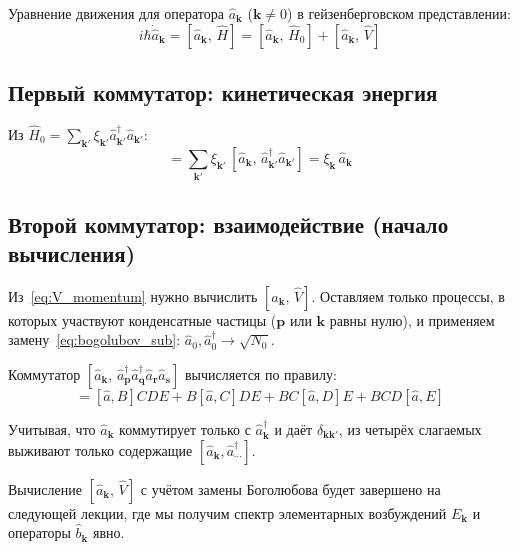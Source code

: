 \documentclass[../general/general]{subfiles}
\begin{document}
Уравнение движения для оператора $\hat{a}_\mathbf{k}$ ($\mathbf{k}\neq 0$) в гейзенберговском представлении:
\begin{equation}
    i\hbar\dot{\hat{a}}_\mathbf{k} = [\hat{a}_\mathbf{k},\,\hat{H}] = [\hat{a}_\mathbf{k},\,\hat{H}_0] + [\hat{a}_\mathbf{k},\,\hat{V}]
    \label{eq:eom_a}
\end{equation}

\subsection{Первый коммутатор: кинетическая энергия}

Из $\hat{H}_0 = \sum_{\mathbf{k}'}\xi_{\mathbf{k}'}\hat{a}^\dagger_{\mathbf{k}'}\hat{a}_{\mathbf{k}'}$:
\begin{equation}
    [\hat{a}_\mathbf{k},\,\hat{H}_0] = \sum_{\mathbf{k}'}\xi_{\mathbf{k}'}\,[\hat{a}_\mathbf{k},\,\hat{a}^\dagger_{\mathbf{k}'}\hat{a}_{\mathbf{k}'}] = \xi_\mathbf{k}\,\hat{a}_\mathbf{k}
\end{equation}

\subsection{Второй коммутатор: взаимодействие (начало вычисления)}

Из~\eqref{eq:V_momentum} нужно вычислить $[\hat{a}_\mathbf{k},\,\hat{V}]$. Оставляем только процессы, в которых участвуют конденсатные частицы ($\mathbf{p}$ или $\mathbf{k}$ равны нулю), и применяем замену~\eqref{eq:bogolubov_sub}: $\hat{a}_0, \hat{a}^\dagger_0 \to \sqrt{N_0}$.

Коммутатор $[\hat{a}_\mathbf{k},\,\hat{a}^\dagger_\mathbf{p}\hat{a}^\dagger_\mathbf{q}\hat{a}_\mathbf{r}\hat{a}_\mathbf{s}]$ вычисляется по правилу:
\begin{equation}
    [\hat{a},\,BCDE] = [\hat{a},B]CDE + B[\hat{a},C]DE + BC[\hat{a},D]E + BCD[\hat{a},E]
\end{equation}

Учитывая, что $\hat{a}_\mathbf{k}$ коммутирует только с $\hat{a}^\dagger_\mathbf{k}$ и даёт $\delta_{\mathbf{k}\mathbf{k}'}$, из четырёх слагаемых выживают только содержащие $[\hat{a}_\mathbf{k}, \hat{a}^\dagger_{\cdots}]$.

Вычисление $[\hat{a}_\mathbf{k},\,\hat{V}]$ с учётом замены Боголюбова будет завершено на следующей лекции, где мы получим спектр элементарных возбуждений $E_\mathbf{k}$ и операторы $\hat{b}_\mathbf{k}$ явно.

\end{document}
